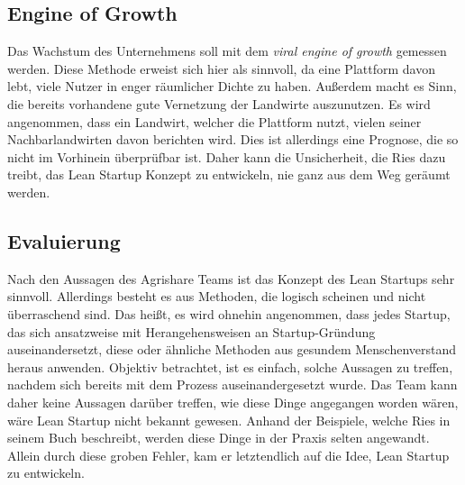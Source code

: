 \subsection*{\label{sec:LeanStartup-Umsetzung-EngineOfGrowth}\thesubsection\quad Engine of Growth}Das Wachstum des Unternehmens soll mit dem \textit{viral engine of growth} gemessen werden. Diese Methode erweist sich hier als sinnvoll, da eine Plattform davon lebt, viele Nutzer in enger räumlicher Dichte zu haben. Außerdem macht es Sinn, die bereits vorhandene gute Vernetzung der Landwirte auszunutzen. Es wird angenommen, dass ein Landwirt, welcher die Plattform nutzt, vielen seiner Nachbarlandwirten davon berichten wird. Dies ist allerdings eine Prognose, die so nicht im Vorhinein überprüfbar ist. Daher kann die Unsicherheit, die Ries dazu treibt, das Lean Startup Konzept zu entwickeln, nie ganz aus dem Weg geräumt werden.

\subsection*{\label{sec:LeanStartup-Umsetzung-Evaluierung}\thesubsection\quad Evaluierung}Nach den Aussagen des Agrishare Teams ist das Konzept des Lean Startups sehr sinnvoll. Allerdings besteht es aus Methoden, die logisch scheinen und nicht überraschend sind. Das heißt, es wird ohnehin angenommen, dass jedes Startup, das sich ansatzweise mit Herangehensweisen an Startup-Gründung auseinandersetzt, diese oder ähnliche Methoden aus gesundem Menschenverstand heraus anwenden. Objektiv betrachtet, ist es einfach, solche Aussagen zu treffen, nachdem sich bereits mit dem Prozess auseinandergesetzt wurde. Das Team kann daher keine Aussagen darüber treffen, wie diese Dinge angegangen worden wären, wäre Lean Startup nicht bekannt gewesen. Anhand der Beispiele, welche Ries in seinem Buch beschreibt, werden diese Dinge in der Praxis selten angewandt. Allein durch diese groben Fehler, kam er letztendlich auf die Idee, Lean Startup zu entwickeln.


